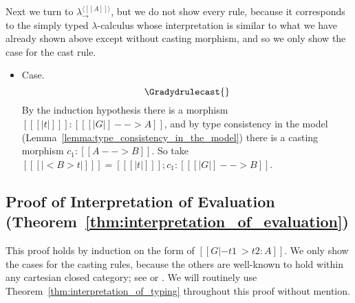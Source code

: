 Next we turn to $\lambda^{\langle [[A]] \rangle }_\to$, but we do
not show every rule, because it corresponds to the simply typed
$\lambda$-calculus whose interpretation is similar to what we have
already shown above except without casting morphism, and so we only
show the case for the cast rule.
\begin{itemize}
\item[] Case.
  \[
  \Gradydrulecast{}
  \]
  By the induction hypothesis there is a morphism $[[ [| t |] ]] : [[ [| G |] --> A]]$,
  and by type consistency in the model (Lemma~\ref{lemma:type_consistency_in_the_model})
  there is a casting morphism $c_1 : [[A --> B]]$.  So take
  $[[ [| < B > t |] ]] = [[ [| t |] ]];c_1 : [[ [| G |] --> B]]$.
\end{itemize}


\subsection{Proof of Interpretation of Evaluation (Theorem~\ref{thm:interpretation_of_evaluation})}
\label{subsec:proof_of_interpretation_of_evaluation}
This proof holds by induction on the form of $[[G |- t1 ~> t2 : A]]$.
We only show the cases for the casting rules, because the others are
well-known to hold within any cartesian closed category; see
\cite{Lambek:1980} or \cite{Crole:1994}.  We will routinely use
Theorem~\ref{thm:interpretation_of_typing} throughout this proof
without mention.

